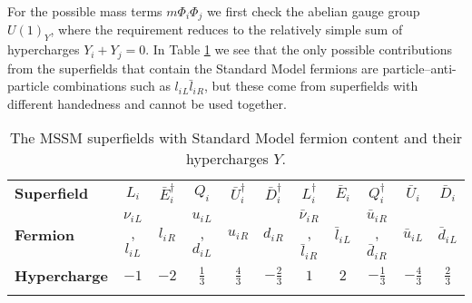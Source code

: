 \documentclass[notes.tex]{subfiles}
\begin{document}
For the possible mass terms $m\Phi_i\Phi_j$ we first check the abelian gauge group $U(1)_Y$, where the requirement reduces to the relatively simple sum of hypercharges $Y_i + Y_j = 0$. In Table \ref{tab:hyper} we see that the only possible contributions from the superfields that contain the Standard Model fermions are particle--anti-particle combinations such as $l_i{}_L\bar{l}_i{}_R$, but these come from superfields with different handedness and cannot be used together. 

\begin{table}[h]
\begin{center}
\begin{tabular}{l | c | c | c | c | c | c | c | c | c | c } 
\noalign{\smallskip}\hline\noalign{\smallskip}
{\bf Superfield} & $L_i$ & $\bar{E}^\dagger_i$ & $Q_i$ & $\bar{U}_i^\dagger$ & $\bar{D}_i^\dagger$ & $L_i^\dagger$ & $\bar{E}_i$ & $Q_i^\dagger$ & $\bar{U}_i$ & $\bar{D}_i$ \\
\noalign{\smallskip}\hline\noalign{\smallskip} 
{\bf Fermion}    & $\nu_i{}_L$, $l_i{}_L$ & $l_i{}_R$ & $u_i{}_L$,$d_i{}_L$ & $u_i{}_R$ & $d_i{}_R$ & $\bar{\nu}_i{}_R$, $\bar{l}_i{}_R$ & $\bar{l}_i{}_L$ & $\bar{u}_i{}_R$,$\bar{d}_i{}_R$ & $\bar{u}_i{}_L$ & $\bar{d}_i{}_L$ \\
{\bf Hypercharge} & $-1$ & $-2$ & $\frac{1}{3}$ & $\frac{4}{3}$ & $-\frac{2}{3}$ & $1$ & $2$ & $-\frac{1}{3}$ & $-\frac{4}{3}$ & $\frac{2}{3}$ \\
\noalign{\smallskip}\hline\noalign{\smallskip}
\end{tabular}
\caption{The MSSM superfields with Standard Model fermion content and their hypercharges $Y$.}
\label{tab:hyper}
\end{center}
\end{table}
\end{document}
